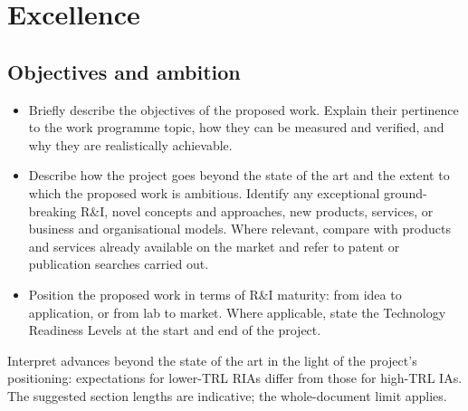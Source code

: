 \section{Excellence}\label{sec:excellence}


\subsection{Objectives and ambition}
\label{sec:objectives}
\begin{heguidance}
\begin{itemize}
  \item Briefly describe the objectives of the proposed work. Explain their
  pertinence to the work programme topic, how they can be measured and verified,
  and why they are realistically achievable.
  \item Describe how the project goes beyond the state of the art and the
  extent to which the proposed work is ambitious. Identify any exceptional
  ground-breaking R\&I, novel concepts and approaches, new products, services,
  or business and organisational models. Where relevant, compare with products
  and services already available on the market and refer to patent or publication
  searches carried out.
  \item Position the proposed work in terms of R\&I maturity: from idea to
  application, or from lab to market. Where applicable, state the Technology
  Readiness Levels at the start and end of the project.
\end{itemize}
Interpret advances beyond the state of the art in the light of the project's
positioning: expectations for lower-TRL RIAs differ from those for high-TRL IAs.
The suggested section lengths are indicative; the whole-document limit applies.
\end{heguidance}

